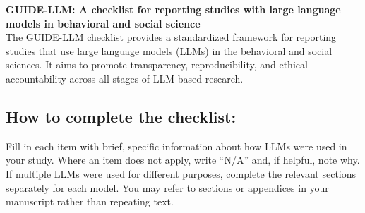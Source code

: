 \documentclass[12pt]{article}
\renewcommand{\maketitle}{
        \vspace{-2cm} \noindent
        \textbf{\Large{GUIDE-LLM: A checklist for reporting studies with large language models in behavioral and social science}} \\
}
\begin{document}
\maketitle

\noindent The GUIDE-LLM checklist provides a standardized framework for reporting studies that use large language models (LLMs) in the behavioral and social sciences. It aims to promote transparency, reproducibility, and ethical accountability across all stages of LLM-based research.


\subsection*{How to complete the checklist:}

\noindent Fill in each item with brief, specific information about how LLMs were used in your study. Where an item does not apply, write “N/A” and, if helpful, note why. If multiple LLMs were used for different purposes, complete the relevant sections separately for each model. You may refer to sections or appendices in your manuscript rather than repeating text.
\end{document}
